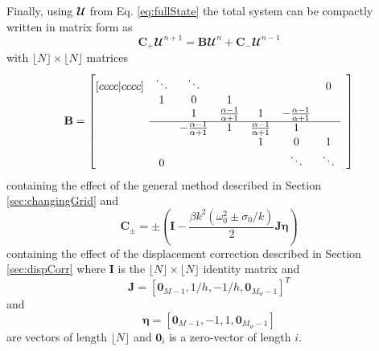 Finally, using $\mathbfcal{U}$ from Eq. \eqref{eq:fullState} the total system can be compactly written in matrix form as
\begin{equation}\label{eq:totalSystem}
    \mathbf{C}_+\mathbfcal{U}^{n+1} = 
    \mathbf{B}
    \mathbfcal{U}^n
    + \mathbf{C}_-\mathbfcal{U}^{n-1}
\end{equation}
with $\lfloor N\rfloor \times \lfloor N\rfloor$ matrices
\begin{equation}\label{eq:bMat}
    \mathbf{B} = 
    \begin{bmatrix}[cccc|cccc]
        & \ddots  &\ddots & & & & 0 & \\
          & 1 & 0 & 1 & & & & \\
         & & 1 & \frac{\alpha - 1}{\alpha + 1} & 1  & -\frac{\alpha - 1}{\alpha + 1} & \\ \cline{2-7}
         & & -\frac{\alpha - 1}{\alpha + 1} & 1  & \frac{\alpha - 1}{\alpha + 1}  & 1 & & \\
            & & & &1 & 0 & 1  \\
            & 0 & &  &  &\ddots & \ddots &
       \end{bmatrix}
\end{equation}
containing the effect of the general method described in Section \ref{sec:changingGrid} and
\begin{equation}\label{eq:CMat}
    \mathbf{C}_\pm = \pm\left(\mathbf{I} - \frac{\beta k^2 (\omega_0^2\pm\sigma_0/k)}{2}\mathbf{J}\boldsymbol{\eta}\right)
\end{equation}
containing the effect of the displacement correction described in Section \ref{sec:dispCorr} where $\mathbf{I}$ is the $\lfloor N\rfloor \times \lfloor N\rfloor$ identity matrix and 
\begin{equation}
    \mathbf{J} = [\mathbf{0}_{M-1}, 1/h, -1/h, \mathbf{0}_{M_w-1}]^T
\end{equation}
and 
\begin{equation}
    \boldsymbol{\eta} = [\mathbf{0}_{M-1}, -1, 1, \mathbf{0}_{M_w-1}]
\end{equation}
are vectors of length $\lfloor N\rfloor$ and $\boldsymbol{0}_i$ is a zero-vector of length $i$.
%
